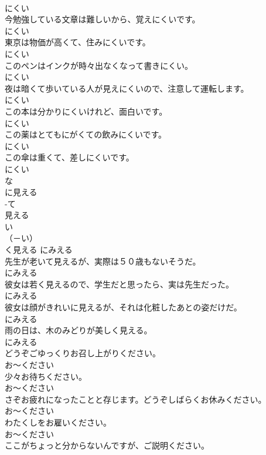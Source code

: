 \documentclass[8pt]{extreport}
\begin{document}
\begin{CJK}{UTF8}{min}
\\	にくい
\\	今勉強している文章は難しいから、覚えにくいです。	
\\	にくい
\\	東京は物価が高くて、住みにくいです。	
\\	にくい
\\	このペンはインクが時々出なくなって書きにくい。	
\\	にくい
\\	夜は暗くて歩いている人が見えにくいので、注意して運転します。	
\\	にくい
\\	この本は分かりにくいけれど、面白いです。	
\\	にくい
\\	この薬はとてもにがくての飲みにくいです。	
\\	にくい
\\	この傘は重くて、差しにくいです。	
\\	にくい
\\	な
\\	に見える	
\\	-て
\\	見える	
\\	い
\\	（－い） 
\\	く見える	にみえる
\\	先生が老いて見えるが、実際は５０歳もないそうだ。	
\\	にみえる
\\	彼女は若く見えるので、学生だと思ったら、実は先生だった。	
\\	にみえる
\\	彼女は顔がきれいに見えるが、それは化粧したあとの姿だけだ。	
\\	にみえる
\\	雨の日は、木のみどりが美しく見える。	
\\	にみえる
\\	どうぞごゆっくりお召し上がりください。	
\\	お～ください
\\	少々お待ちください。	
\\	お～ください
\\	さぞお疲れになったことと存じます。どうぞしばらくお休みください。	
\\	お～ください
\\	わたくしをお雇いください。	
\\	お～ください
\\	ここがちょっと分からないんですが、ご説明ください。	

\end{CJK}
\end{document}
